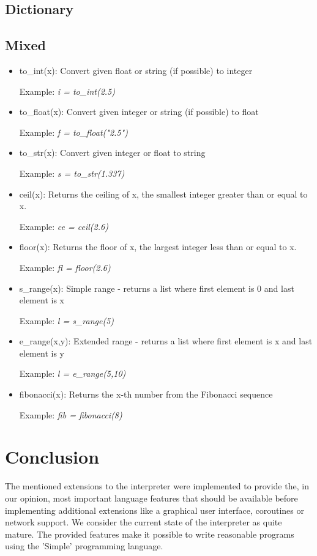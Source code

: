 \documentclass{article}
\begin{document}
\subsection{Dictionary}
\label{builtin_dict}
\subsection{Mixed}
\begin{itemize}
\item to\_int(x): Convert given float or string (if possible) to integer

Example: \textit{i = to\_int(2.5)}

\item to\_float(x): Convert given integer or string (if possible) to float

Example: \textit{f = to\_float("2.5")}

\item to\_str(x): Convert given integer or float to string

Example: \textit{s = to\_str(1.337)}

\item ceil(x): Returns the ceiling of x, the smallest integer greater than or equal to x.

Example: \textit{ce = ceil(2.6)}

\item floor(x): Returns the floor of x, the largest integer less than or equal to x.

Example: \textit{fl = floor(2.6)}

\item s\_range(x): Simple range - returns a list where first element is 0 and last element is x

Example: \textit{l = s\_range(5)}

\item e\_range(x,y): Extended range - returns a list where first element is x and last element is y

Example: \textit{l = e\_range(5,10)}

\item fibonacci(x): Returns the x-th number from the Fibonacci sequence

Example: \textit{fib = fibonacci(8)}
\end{itemize}



\section{Conclusion}
The mentioned extensions to the interpreter were implemented to provide the, in our opinion, most important language features that should be available before implementing additional extensions like a graphical user interface, coroutines or network support. We consider the current state of the interpreter as quite mature. The provided features make it possible to write reasonable programs using the 'Simple' programming language.


\newpage
\end{document}
